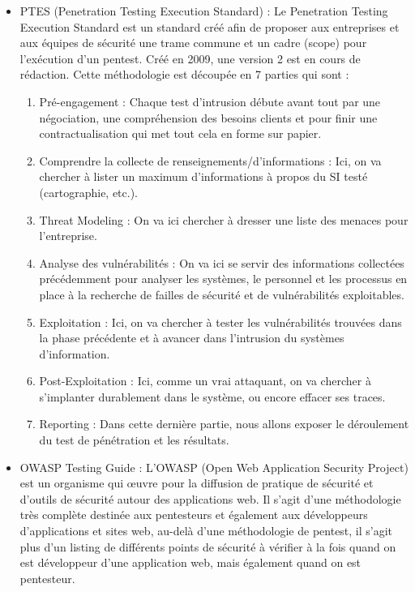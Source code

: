 \documentclass[a4paper]{memoir}
\begin{document}
\begin{itemize}
\item PTES (Penetration Testing Execution Standard) : Le Penetration Testing Execution Standard est un standard créé afin de proposer aux entreprises et aux équipes de sécurité une trame commune et un cadre (scope) pour l’exécution d’un pentest. Créé en 2009, une version 2 est en cours de rédaction. 
Cette méthodologie est découpée en 7 parties qui sont :

\begin{enumerate} 
\item Pré-engagement : Chaque test d’intrusion débute avant tout par une négociation, une compréhension des besoins clients et pour finir une contractualisation qui met tout cela en forme sur papier.
\item Comprendre la collecte de renseignements/d’informations : Ici, on va chercher à lister un maximum d’informations à propos du SI testé (cartographie, etc.).
\item Threat Modeling : On va ici chercher à dresser une liste des menaces pour l’entreprise.
\item Analyse des vulnérabilités : On va ici se servir des informations collectées précédemment pour analyser les systèmes, le personnel et les processus en place à la recherche de failles de sécurité et de vulnérabilités exploitables.
\item Exploitation : Ici, on va chercher à tester les vulnérabilités trouvées dans la phase précédente et à avancer dans l’intrusion du systèmes d’information.
\item Post-Exploitation : Ici, comme un vrai attaquant, on va chercher à s'implanter durablement dans le système, ou encore effacer ses traces.
\item Reporting : Dans cette dernière partie, nous allons exposer le déroulement du test de pénétration et les résultats. \\
\end{enumerate}

\item OWASP Testing Guide : L’OWASP (Open Web Application Security Project) est un organisme qui œuvre pour la diffusion de pratique de sécurité et d’outils de sécurité autour des applications web. Il s’agit d’une méthodologie très complète destinée aux pentesteurs et également aux développeurs d’applications et sites web, au-delà d’une méthodologie de pentest, il s’agit plus d’un listing de différents points de sécurité à vérifier à la fois quand on est développeur d’une application web, mais également quand on est pentesteur.\\


\end{itemize}
\end{document}
